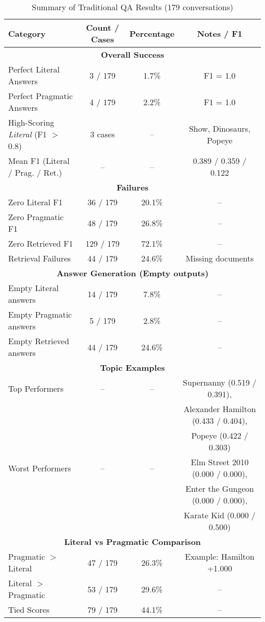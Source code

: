 \documentclass[12pt, letterpaper]{article}
\begin{document}
\begin{table}[h!]
\centering
\caption{Summary of Traditional QA Results (179 conversations)}
\begin{tabular}{p{4cm}ccc}
\hline
\textbf{Category} & \textbf{Count / Cases} & \textbf{Percentage} & \textbf{Notes / F1} \\
\hline
\multicolumn{4}{c}{\textbf{Overall Success}} \\
Perfect Literal Answers & 3 / 179 & 1.7\% & F1 = 1.0 \\
Perfect Pragmatic Answers & 4 / 179 & 2.2\% & F1 = 1.0 \\
High-Scoring \emph{Literal} (F1 $>$ 0.8) & 3 cases & -- & Show, Dinosaurs, Popeye \\
Mean F1 (Literal / Prag. / Ret.) & -- & -- & 0.389 / 0.359 / 0.122 \\
\hline
\multicolumn{4}{c}{\textbf{Failures}} \\
Zero Literal F1 & 36 / 179 & 20.1\% & -- \\
Zero Pragmatic F1 & 48 / 179 & 26.8\% & -- \\
Zero Retrieved F1 & 129 / 179 & 72.1\% & -- \\
Retrieval Failures & 44 / 179 & 24.6\% & Missing documents \\
\hline
\multicolumn{4}{c}{\textbf{Answer Generation (Empty outputs)}} \\
Empty Literal answers & 14 / 179 & 7.8\% & -- \\
Empty Pragmatic answers & 5 / 179 & 2.8\% & -- \\
Empty Retrieved answers & 44 / 179 & 24.6\% & -- \\
\hline
\multicolumn{4}{c}{\textbf{Topic Examples}} \\
Top Performers & -- & -- & Supernanny (0.519 / 0.391), \\
 & & & Alexander Hamilton (0.433 / 0.404), \\
 & & & Popeye (0.422 / 0.303) \\
Worst Performers & -- & -- & Elm Street 2010 (0.000 / 0.000), \\
 & & & Enter the Gungeon (0.000 / 0.000), \\
 & & & Karate Kid (0.000 / 0.500) \\
\hline
\multicolumn{4}{c}{\textbf{Literal vs Pragmatic Comparison}} \\
Pragmatic $>$ Literal & 47 / 179 & 26.3\% & Example: Hamilton +1.000 \\
Literal $>$ Pragmatic & 53 / 179 & 29.6\% & -- \\
Tied Scores & 79 / 179 & 44.1\% & -- \\
\hline
\end{tabular}
\end{table}
\end{document}
